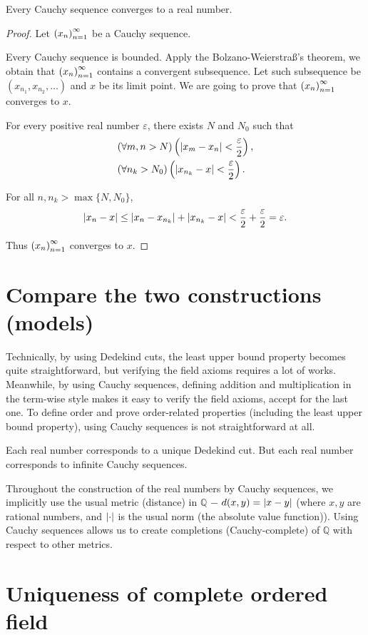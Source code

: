 \begin{theorem}
    Every Cauchy sequence converges to a real number.
\end{theorem}

\begin{proof}
    Let ${\left({x_{n}}\right)}^{\infty}_{n=1}$ be a Cauchy sequence.

    Every Cauchy sequence is bounded. Apply the Bolzano-Weierstra{\ss}'s theorem, we obtain that ${\left({x_{n}}\right)}^{\infty}_{n=1}$ contains a convergent subsequence. Let such subsequence be $(x_{n_{1}}, x_{n_{2}}, \ldots)$ and $x$ be its limit point. We are going to prove that ${\left({x_{n}}\right)}^{\infty}_{n=1}$ converges to $x$.

    For every positive real number $\varepsilon$, there exists $N$ and $N_{0}$ such that
    \[
        \begin{split}
            & (\forall m, n > N)\left(\left\vert{x_{m} - x_{n}}\right\vert < \frac{\varepsilon}{2}\right), \\
            & (\forall n_{k} > N_{0})\left(\left\vert{x_{n_{k}} - x}\right\vert < \frac{\varepsilon}{2}\right).
        \end{split}
    \]

    For all $n, n_{k} > \max\{ N, N_{0} \}$,
    \[
        \left\vert{x_{n} - x}\right\vert \le \left\vert{x_{n} - x_{n_{k}}}\right\vert + \left\vert{x_{n_{k}} - x}\right\vert < \frac{\varepsilon}{2} + \frac{\varepsilon}{2} = \varepsilon.
    \]

    Thus ${\left({x_{n}}\right)}^{\infty}_{n=1}$ converges to $x$.
\end{proof}

\section{Compare the two constructions (models)}

Technically, by using Dedekind cuts, the least upper bound property becomes quite straightforward, but verifying the field axioms requires a lot of works. Meanwhile, by using Cauchy sequences, defining addition and multiplication in the term-wise style makes it easy to verify the field axioms, accept for the last one. To define order and prove order-related properties (including the least upper bound property), using Cauchy sequences is not straightforward at all.

Each real number corresponds to a unique Dedekind cut. But each real number corresponds to infinite Cauchy sequences.

Throughout the construction of the real numbers by Cauchy sequences, we implicitly use the usual metric (distance) in $\mathbb{Q}$ $-$ $d(x, y) = \left\vert{x - y}\right\vert$ (where $x, y$ are rational numbers, and $\left\vert{\cdot}\right\vert$ is the usual norm (the absolute value function)). Using Cauchy sequences allows us to create completions (Cauchy-complete) of $\mathbb{Q}$ with respect to other metrics.

\section{Uniqueness of complete ordered field}

